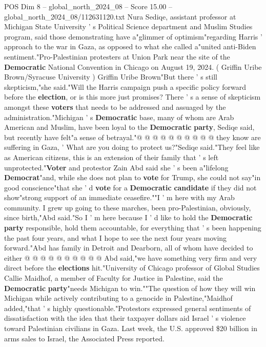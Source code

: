 \begin{textsample}{POS Dim 8 – global\_north\_2024\_08 – Score 15.00 – global\_north\_2024\_08/112631120.txt}
Nura Sediqe, assistant professor at Michigan State University ' s Political Science department and Muslim Studies program, said those demonstrating have a"glimmer of optimism"regarding Harris ' approach to the war in Gaza, as opposed to what she called a"united anti-Biden sentiment."Pro-Palestinian protesters at Union Park near the site of the \textbf{Democratic} National Convention in Chicago on August 19, 2024. ( Griffin Uribe Brown/Syracuse University ) Griffin Uribe Brown"But there ' s still skepticism,"she said."Will the Harris campaign push a specific policy forward before the \textbf{election}, or is this more just promises?
There ' s a sense of skepticism amongst these \textbf{voters} that needs to be addressed and assuaged by the administration."Michigan ' s \textbf{Democratic} base, many of whom are Arab American and Muslim, have been loyal to the \textbf{Democratic} \textbf{party}, Sediqe said, but recently have felt"a sense of betrayal."@ @ @ @ @ @ @ @ @ @ they know are suffering in Gaza, ' What are you doing to protect us?"Sediqe said."They feel like as American citizens, this is an extension of their family that ' s left unprotected."\textbf{Voter} and protestor Zain Abd said she ' s been a"lifelong \textbf{Democrat}"and, while she does not plan to \textbf{vote} for Trump, she could not say"in good conscience"that she ' d \textbf{vote} for a \textbf{Democratic} \textbf{candidate} if they did not show"strong support of an immediate ceasefire.""I ' m here with my Arab community.
I grew up going to these marches, been pro-Palestinian, obviously, since birth,"Abd said."So I ' m here because I ' d like to hold the \textbf{Democratic} \textbf{party} responsible, hold them accountable, for everything that ' s been happening the past four years, and what I hope to see the next four years moving forward."Abd has family in Detroit and Dearborn, all of whom have decided to either @ @ @ @ @ @ @ @ @ @ Abd said,"we have something very firm and very direct before the \textbf{elections} hit."University of Chicago professor of Global Studies Callie Maidhof, a member of Faculty for Justice in Palestine, said the \textbf{Democratic} \textbf{party}"needs Michigan to win.""The question of how they will win Michigan while actively contributing to a genocide in Palestine,"Maidhof added,"that ' s highly questionable."Protestors expressed general sentiments of dissatisfaction with the idea that their taxpayer dollars aid Israel ' s violence toward Palestinian civilians in Gaza.
Last week, the U.S. approved \$20 billion in arms sales to Israel, the Associated Press reported.

\end{textsample}
